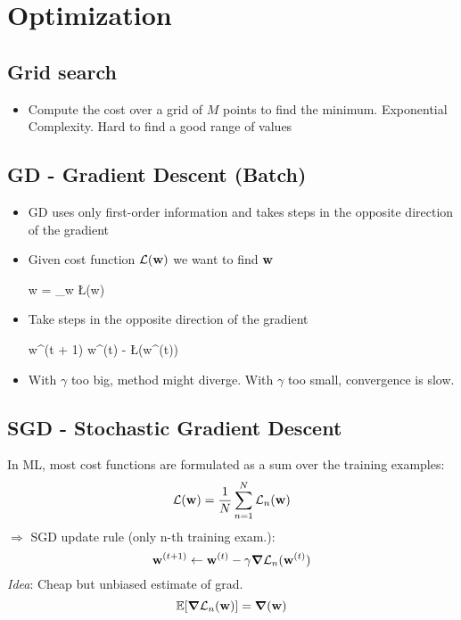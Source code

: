 \section{Optimization}
\subsection{Grid search}
\begin{itemize}
    \item Compute the cost over a grid of $M$ points to find the minimum. Exponential Complexity. Hard to find a good range of values
\end{itemize}


\subsection{GD - Gradient Descent (Batch)}
\begin{itemize}
	\item GD uses only first-order information and takes steps in the opposite direction of the gradient
	\item Given cost function $\mathcal{L}(\mathbf{w})$ we want to find $\mathbf{w}$
	\begin{myalign*}
	    \*w = \arg\min_{\*w} \L(\*w)
	\end{myalign*}
    \item Take steps in the opposite direction of the gradient
   	\begin{myalign*}
	    \*w^{(t + 1)} \leftarrow \*w^{(t)} - \gamma \bm \nabla \L(\*w^{(t)})
   	\end{myalign*}

    \item With $\gamma$ too big, method might diverge. With $\gamma$ too small, convergence is slow.
\end{itemize}



\subsection{SGD - Stochastic Gradient Descent}

In ML, most cost functions are formulated as a sum over the training examples:
$$ \mathcal{L}(\mathbf{w}) = \frac{1}{N}\sum_{n=1}^N\mathcal{L}_n(\mathbf{w})$$
$\Rightarrow$ SGD update rule (only n-th training exam.):
$$ \mathbf{w}^{(t + 1)} \leftarrow \mathbf{w}^{(t)} - \gamma \bm \nabla \mathcal{L}_n(\mathbf{w}^{(t)})$$
\emph{Idea}: Cheap but unbiased estimate of grad. $$\operatorname{\mathbb{E}}[\bm\nabla\mathcal{L}_n(\mathbf{w})] = \bm \nabla(\mathbf{w})$$

